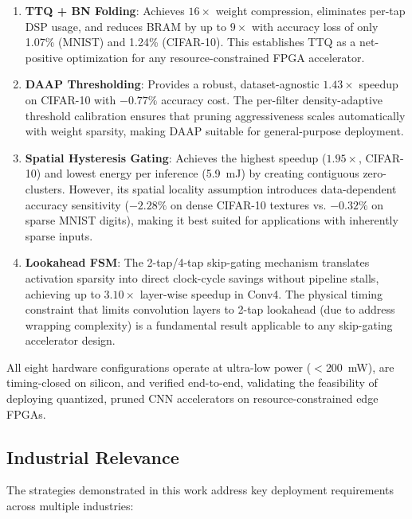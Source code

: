 \documentclass[conference]{IEEEtran}
\begin{document}
\begin{enumerate}[nosep]
    \item \textbf{TTQ + BN Folding}: Achieves $16\times$ weight compression, eliminates per-tap DSP usage, and reduces BRAM by up to $9\times$ with accuracy loss of only 1.07\% (MNIST) and 1.24\% (CIFAR-10). This establishes TTQ as a net-positive optimization for any resource-constrained FPGA accelerator.

    \item \textbf{DAAP Thresholding}: Provides a robust, dataset-agnostic $1.43\times$ speedup on CIFAR-10 with $-0.77\%$ accuracy cost. The per-filter density-adaptive threshold calibration ensures that pruning aggressiveness scales automatically with weight sparsity, making DAAP suitable for general-purpose deployment.

    \item \textbf{Spatial Hysteresis Gating}: Achieves the highest speedup ($1.95\times$, CIFAR-10) and lowest energy per inference (5.9~mJ) by creating contiguous zero-clusters. However, its spatial locality assumption introduces data-dependent accuracy sensitivity ($-2.28\%$ on dense CIFAR-10 textures vs. $-0.32\%$ on sparse MNIST digits), making it best suited for applications with inherently sparse inputs.

    \item \textbf{Lookahead FSM}: The 2-tap/4-tap skip-gating mechanism translates activation sparsity into direct clock-cycle savings without pipeline stalls, achieving up to $3.10\times$ layer-wise speedup in Conv4. The physical timing constraint that limits convolution layers to 2-tap lookahead (due to address wrapping complexity) is a fundamental result applicable to any skip-gating accelerator design.
\end{enumerate}

All eight hardware configurations operate at ultra-low power ($<$200~mW), are timing-closed on silicon, and verified end-to-end, validating the feasibility of deploying quantized, pruned CNN accelerators on resource-constrained edge FPGAs.

\subsection{Industrial Relevance}

The strategies demonstrated in this work address key deployment requirements across multiple industries:
\end{document}
